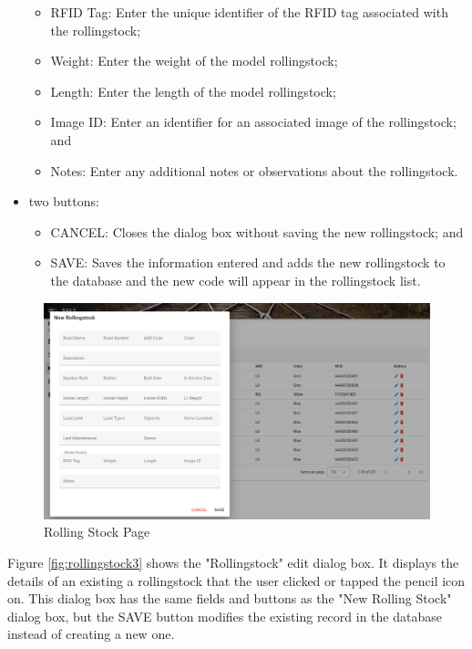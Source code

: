 \begin{itemize}
\begin{itemize}
        \item RFID Tag: Enter the unique identifier of the RFID tag associated with the rollingstock;
        \item Weight: Enter the weight of the model rollingstock;
        \item Length: Enter the length of the model rollingstock;
        \item Image ID: Enter an identifier for an associated image of the rollingstock; and
        \item Notes: Enter any additional notes or observations about the rollingstock.
    \end{itemize}
    \item two buttons:
    \begin{itemize}
        \item CANCEL: Closes the dialog box without saving the new rollingstock; and
        \item SAVE: Saves the information entered and adds the new rollingstock to the database and the new code will appear in the rollingstock list.
    \end{itemize}
\end{itemize} 
\begin{figure}[H]
    \centering
    \includegraphics[scale=0.33]{./images/rs-add.png}
    \caption{Rolling Stock Page}
    \label{fig:rollingstock2}
\end{figure}

Figure \ref{fig:rollingstock3} shows the "Rollingstock" edit dialog box. It displays the details of an existing a rollingstock that 
the user clicked or tapped the pencil icon on. This dialog box has the same fields and buttons as the "New Rolling Stock" dialog box, 
but the SAVE button modifies the existing record in the database instead of creating a new one.

